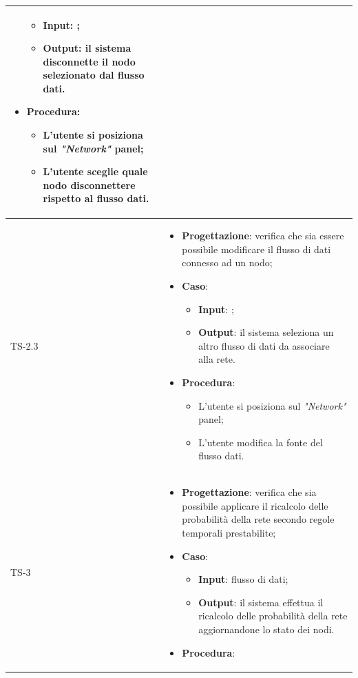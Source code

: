\begin{longtable}{|C{2.5cm}|C{13cm}|}
\begin{itemize}
	\begin{itemize}
		\item \textbf{Input}: ;
		\item \textbf{Output}: il sistema disconnette il nodo selezionato dal flusso dati.
	\end{itemize}
	\item \textbf{Procedura}:
	\begin{itemize}
		\item L'utente si posiziona sul \emph{"Network"} panel;
		\item L'utente sceglie quale nodo disconnettere rispetto al flusso dati.
	\end{itemize} 
\end{itemize}
	 \\
	\hline
	{TS-2.3} &
\begin{itemize}
	\item \textbf{Progettazione}: verifica che sia essere possibile modificare il
	flusso di dati connesso ad un nodo;
	\item \textbf{Caso}: 
	\begin{itemize}
		\item \textbf{Input}: ;
		\item \textbf{Output}: il sistema  seleziona un altro flusso di dati da associare alla rete.
	\end{itemize}
	\item \textbf{Procedura}:
	\begin{itemize}
		\item L'utente si posiziona sul \emph{"Network"} panel;
		\item L'utente modifica la fonte del flusso dati.
	\end{itemize} 
\end{itemize}	
	  \\
	\hline
	{TS-3} & 
\begin{itemize}
	\item \textbf{Progettazione}: verifica che sia possibile applicare il
	ricalcolo delle probabilità della rete secondo regole temporali prestabilite;
	\item \textbf{Caso}: 
	\begin{itemize}
		\item \textbf{Input}: flusso di dati;
		\item \textbf{Output}: il sistema effettua il ricalcolo delle probabilità della
		rete aggiornandone lo stato dei nodi.
	\end{itemize}
	\item \textbf{Procedura}:

\end{itemize}
\end{longtable}
